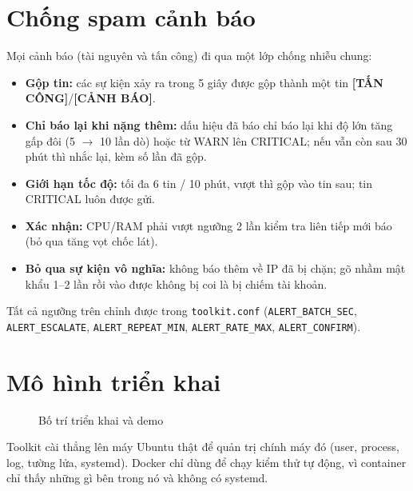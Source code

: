 \documentclass[12pt,a4paper,oneside]{report}
\newcommand{\cmd}[1]{\texttt{\small #1}}
\begin{document}
\section{Chống spam cảnh báo}
Mọi cảnh báo (tài nguyên và tấn công) đi qua một lớp chống nhiễu chung:
\begin{itemize}
  \item \textbf{Gộp tin:} các sự kiện xảy ra trong 5 giây được gộp thành một tin \textbf{[TẤN CÔNG]}/\textbf{[CẢNH BÁO]}.
  \item \textbf{Chỉ báo lại khi nặng thêm:} dấu hiệu đã báo chỉ báo lại khi độ lớn tăng gấp đôi (5 $\rightarrow$ 10 lần dò) hoặc từ WARN lên CRITICAL; nếu vẫn còn sau 30 phút thì nhắc lại, kèm số lần đã gộp.
  \item \textbf{Giới hạn tốc độ:} tối đa 6 tin / 10 phút, vượt thì gộp vào tin sau; tin CRITICAL luôn được gửi.
  \item \textbf{Xác nhận:} CPU/RAM phải vượt ngưỡng 2 lần kiểm tra liên tiếp mới báo (bỏ qua tăng vọt chốc lát).
  \item \textbf{Bỏ qua sự kiện vô nghĩa:} không báo thêm về IP đã bị chặn; gõ nhầm mật khẩu 1–2 lần rồi vào được không bị coi là bị chiếm tài khoản.
\end{itemize}
Tất cả ngưỡng trên chỉnh được trong \cmd{toolkit.conf} (\cmd{ALERT\_BATCH\_SEC}, \cmd{ALERT\_ESCALATE}, \cmd{ALERT\_REPEAT\_MIN}, \cmd{ALERT\_RATE\_MAX}, \cmd{ALERT\_CONFIRM}).

\section{Mô hình triển khai}
\begin{figure}[H]\centering
{}
\caption{Bố trí triển khai và demo}
\end{figure}
Toolkit cài thẳng lên máy Ubuntu thật để quản trị chính máy đó (user, process, log, tường lửa, systemd). Docker chỉ dùng để chạy kiểm thử tự động, vì container chỉ thấy những gì bên trong nó và không có systemd.
\end{document}
